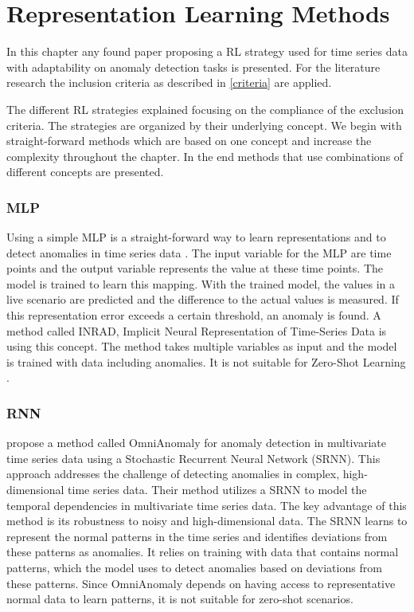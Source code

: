 \section{Representation Learning Methods}\label{review}
In this chapter any found paper proposing a RL strategy used for time series data with adaptability on anomaly detection tasks is presented. For the literature research the inclusion criteria as described in \ref{criteria} are applied.

The different RL strategies explained focusing on the compliance of the exclusion criteria. The strategies are organized by their underlying concept. We begin with straight-forward methods which are based on one concept and increase the complexity throughout the chapter. In the end methods that use combinations of different concepts are presented.
\subsubsection{MLP}
Using a simple MLP is a straight-forward way to learn representations and to detect anomalies in time series data \cite{nielsen_neural_2015}. The input variable for the MLP are time points and the output variable represents the value at these time points. The model is trained to learn this mapping. With the trained model, the values in a live scenario are predicted and the difference to the actual values is measured. If this representation error exceeds a certain threshold, an anomaly is found. A method called INRAD, Implicit Neural Representation of Time-Series Data is using this concept. The method takes multiple variables as input and the model is trained with data including anomalies. It is not suitable for Zero-Shot Learning \cite{jeong_time-series_2022}.
\subsubsection{RNN}
\cite{su_robust_2019} propose a method called OmniAnomaly for anomaly detection in multivariate time series data using a Stochastic Recurrent Neural Network (SRNN). This approach addresses the challenge of detecting anomalies in complex, high-dimensional time series data.
Their method utilizes a SRNN to model the temporal dependencies in multivariate time series data.
The key advantage of this method is its robustness to noisy and high-dimensional data. The SRNN learns to represent the normal patterns in the time series and identifies deviations from these patterns as anomalies. It relies on training with data that contains normal patterns, which the model uses to detect anomalies based on deviations from these patterns. Since OmniAnomaly depends on having access to representative normal data to learn patterns, it is not suitable for zero-shot scenarios.
